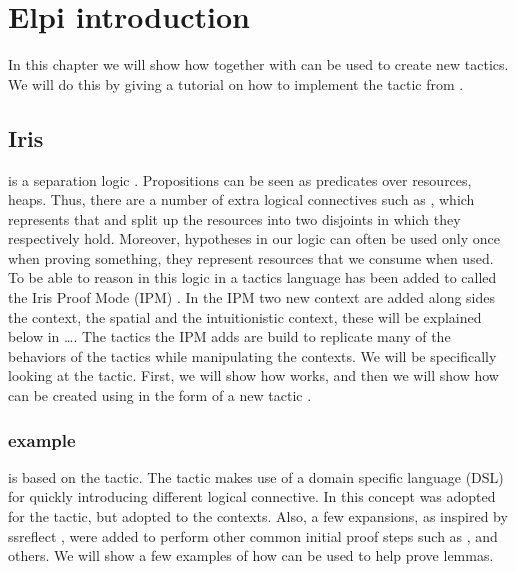 \documentclass[thesis.tex]{subfiles}
\begin{document}
\chapter{Elpi introduction}
In this chapter we will show how \elpi together with \ce can be used to create new tactics. We will do this by giving a tutorial on how to implement the  tactic from \iris.

\section[Iris iIntros]{Iris }
\iris is a separation logic \cite*{jungIrisMonoidsInvariants2015a,jungHigherorderGhostState2016,krebbersEssenceHigherOrderConcurrent2017,jungIrisGroundModular2018}. Propositions can be seen as predicates over resources, \eg heaps. Thus, there are a number of extra logical connectives such as , which represents that  and  split up the resources into two disjoints in which they respectively hold. Moreover, hypotheses in our logic can often be used only once when proving something, they represent resources that we consume when used. To be able to reason in this logic in \coq a tactics language has been added to \coq called the Iris Proof Mode (IPM) \cite*{krebbersInteractiveProofsHigherorder2017,krebbersMoSeLGeneralExtensible2018}. In the IPM two new context are added along sides the \coq context, the spatial and the intuitionistic context, these will be explained below in \ldots.
The tactics the IPM adds are build to replicate many of the behaviors of the \coq tactics while manipulating the \iris contexts. We will be specifically looking at the  tactic. First, we will show how  works, and then we will show how  can be created using \elpi in the form of a new tactic .

\subsection[iIntros example]{ example}
 is based on the \coq {} tactic. The \coq {} tactic makes use of a domain specific language (DSL) for quickly introducing different logical connective. In \iris this concept was adopted for the  tactic, but adopted to the \iris contexts. Also, a few expansions, as inspired by ssreflect \cite*{huetCoqProofAssistant1997, gonthierSmallScaleReflection2016}, were added to perform other common initial proof steps such as ,  and others. We will show a few examples of how  can be used to help prove lemmas.
\end{document}
